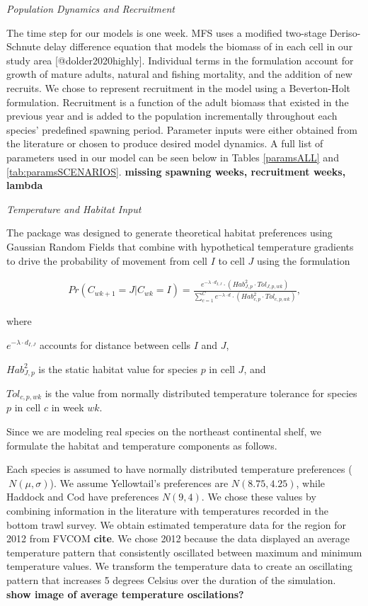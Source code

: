 \documentclass[
  12pt,
]{article}
\begin{document}
\emph{Population Dynamics and Recruitment}

The time step for our models is one week. MFS uses a modified two-stage Deriso-Schnute delay difference equation that models the biomass of in each cell in our study area {[}@dolder2020highly{]}. Individual terms in the formulation account for growth of mature adults, natural and fishing mortality, and the addition of new recruits. We chose to represent recruitment in the model using a Beverton-Holt formulation. Recruitment is a function of the adult biomass that existed in the previous year and is added to the population incrementally throughout each species' predefined spawning period. Parameter inputs were either obtained from the literature or chosen to produce desired model dynamics. A full list of parameters used in our model can be seen below in Tables \ref{paramsALL} and \ref{tab:paramsSCENARIOS}. \textbf{missing spawning weeks, recruitment weeks, lambda}

\emph{Temperature and Habitat Input}

The package was designed to generate theoretical habitat preferences using Gaussian Random Fields that combine with hypothetical temperature gradients to drive the probability of movement from cell \(I\) to cell \(J\) using the formulation

\begin{align*}
Pr(C_{wk+1}=J|C_{wk}=I) = \frac{e^{-\lambda \cdot d_{I,J}}\cdot(Hab^2_{J,p} \cdot Tol_{J,p,wk})}{\sum^C_{c=1}e^{-\lambda \cdot d} \cdot (Hab^2_{c,p} \cdot Tol_{c,p,wk})},
\end{align*}

where

\(e^{-\lambda \cdot d_{I,J}}\) accounts for distance between cells \(I\) and \(J\),

\(Hab^2_{J,p}\) is the static habitat value for species \(p\) in cell \(J\), and

\(Tol_{c,p,wk}\) is the value from normally distributed temperature tolerance for species \(p\) in cell \(c\) in week \(wk\).

Since we are modeling real species on the northeast continental shelf, we formulate the habitat and temperature components as follows.

Each species is assumed to have normally distributed temperature preferences (\(~N(\mu,\sigma)\)). We assume Yellowtail's preferences are \(N(8.75,4.25)\), while Haddock and Cod have preferences \(N(9,4)\). We chose these values by combining information in the literature with temperatures recorded in the bottom trawl survey. We obtain estimated temperature data for the region for 2012 from FVCOM \textbf{cite}. We chose 2012 because the data displayed an average temperature pattern that consistently oscillated between maximum and minimum temperature values. We transform the temperature data to create an oscillating pattern that increases 5 degrees Celsius over the duration of the simulation. \textbf{show image of average temperature oscilations?}
\end{document}
